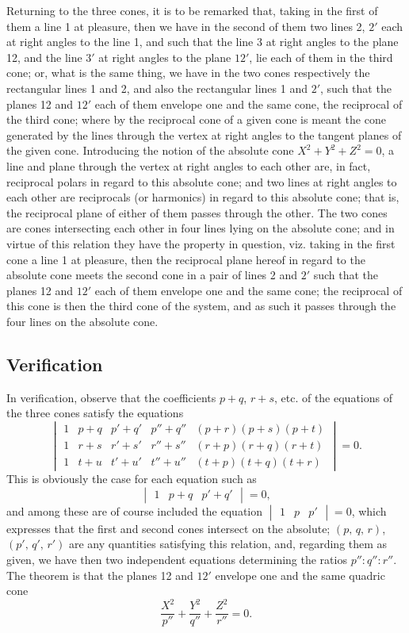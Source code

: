 \documentclass[11pt,a4paper]{article}
\theoremstyle{cayley}
\begin{document}
Returning to the three cones, it is to be remarked that, taking in the first of them a line 1 at pleasure, then we have in the second of them two lines 2, $2'$ each at right angles to the line 1, and such that the line 3 at right angles to the plane 12, and the line $3'$ at right angles to the plane $12'$, lie each of them in the third cone; or, what is the same thing, we have in the two cones respectively the rectangular lines 1 and 2, and also the rectangular lines 1 and $2'$, such that the planes 12 and $12'$ each of them envelope one and the same cone, the reciprocal of the third cone; where by the reciprocal cone of a given cone is meant the cone generated by the lines through the vertex at right angles to the tangent planes of the given cone. Introducing the notion of the absolute cone $X^{2} + Y^{2} + Z^{2} = 0$, a line and plane through the vertex at right angles to each other are, in fact, reciprocal polars in regard to this absolute cone; and two lines at right angles to each other are reciprocals (or harmonics) in regard to this absolute cone; that is, the reciprocal plane of either of them passes through the other. The two cones are cones intersecting each other in four lines lying on the absolute cone; and in virtue of this relation they have the property in question, viz. taking in the first cone a line 1 at pleasure, then the reciprocal plane hereof in regard to the absolute cone meets the second cone in a pair of lines 2 and $2'$ such that the planes 12 and $12'$ each of them envelope one and the same cone; the reciprocal of this cone is then the third cone of the system, and as such it passes through the four lines on the absolute cone.

\subsection*{Verification}

In verification, observe that the coefficients $p+q$, $r+s$, etc. of the equations of the three cones satisfy the equations
\[
\begin{vmatrix}
1 & p+q & p'+q' & p''+q'' & (p+r)(p+s)(p+t) \\
1 & r+s & r'+s' & r''+s'' & (r+p)(r+q)(r+t) \\
1 & t+u & t'+u' & t''+u'' & (t+p)(t+q)(t+r)
\end{vmatrix} = 0.
\]
This is obviously the case for each equation such as
\[
\begin{vmatrix}
1 & p+q & p'+q'
\end{vmatrix} = 0,
\]
and among these are of course included the equation $\begin{vmatrix}1 & p & p'\end{vmatrix} = 0$, which expresses that the first and second cones intersect on the absolute; $(p,\, q,\, r)$, $(p',\, q',\, r')$ are any quantities satisfying this relation, and, regarding them as given, we have then two independent equations determining the ratios $p'' : q'' : r''$. The theorem is that the planes 12 and $12'$ envelope one and the same quadric cone
\[
\frac{X^{2}}{p''} + \frac{Y^{2}}{q''} + \frac{Z^{2}}{r''} = 0.
\]
\end{document}
